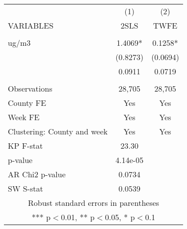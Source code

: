 \begin{tabular}{lcc} \hline
 & (1) & (2) \\
VARIABLES & 2SLS & TWFE \\ \hline
 &  &  \\
ug/m3 & 1.4069* & 0.1258* \\
 & (0.8273) & (0.0694) \\
 & 0.0911 & 0.0719 \\
 &  &  \\
Observations & 28,705 & 28,705 \\
County FE & Yes & Yes \\
Week FE & Yes & Yes \\
Clustering: County and week & Yes & Yes \\
KP F-stat & 23.30 &  \\
p-value & 4.14e-05 &  \\
AR Chi2 p-value & 0.0734 &  \\
 SW S-stat & 0.0539 &  \\ \hline
\multicolumn{3}{c}{ Robust standard errors in parentheses} \\
\multicolumn{3}{c}{ *** p$<$0.01, ** p$<$0.05, * p$<$0.1} \\
\end{tabular}
